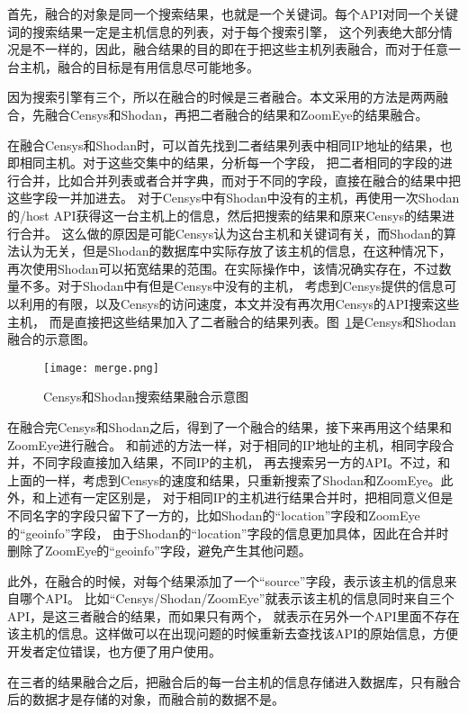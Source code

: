首先，融合的对象是同一个搜索结果，也就是一个关键词。每个API对同一个关键词的搜索结果一定是主机信息的列表，对于每个搜索引擎，
这个列表绝大部分情况是不一样的，因此，融合结果的目的即在于把这些主机列表融合，而对于任意一台主机，融合的目标是有用信息尽可能地多。

因为搜索引擎有三个，所以在融合的时候是三者融合。本文采用的方法是两两融合，先融合Censys和Shodan，再把二者融合的结果和ZoomEye的结果融合。

在融合Censys和Shodan时，可以首先找到二者结果列表中相同IP地址的结果，也即相同主机。对于这些交集中的结果，分析每一个字段，
把二者相同的字段的进行合并，比如合并列表或者合并字典，而对于不同的字段，直接在融合的结果中把这些字段一并加进去。
对于Censys中有Shodan中没有的主机，再使用一次Shodan的/host API获得这一台主机上的信息，然后把搜索的结果和原来Censys的结果进行合并。
这么做的原因是可能Censys认为这台主机和关键词有关，而Shodan的算法认为无关，但是Shodan的数据库中实际存放了该主机的信息，在这种情况下，
再次使用Shodan可以拓宽结果的范围。在实际操作中，该情况确实存在，不过数量不多。对于Shodan中有但是Censys中没有的主机，
考虑到Censys提供的信息可以利用的有限，以及Censys的访问速度，本文并没有再次用Censys的API搜索这些主机，
而是直接把这些结果加入了二者融合的结果列表。图~\ref{fig:merge}是Censys和Shodan融合的示意图。

\begin{figure}[H]
    \centering
    \texttt{[image: merge.png]}
    \caption{Censys和Shodan搜索结果融合示意图}
    \label{fig:merge}
  \end{figure}

在融合完Censys和Shodan之后，得到了一个融合的结果，接下来再用这个结果和ZoomEye进行融合。
和前述的方法一样，对于相同的IP地址的主机，相同字段合并，不同字段直接加入结果，不同IP的主机，
再去搜索另一方的API。不过，和上面的一样，考虑到Censys的速度和结果，只重新搜索了Shodan和ZoomEye。此外，和上述有一定区别是，
对于相同IP的主机进行结果合并时，把相同意义但是不同名字的字段只留下了一方的，比如Shodan的“location”字段和ZoomEye的“geoinfo”字段，
由于Shodan的“location”字段的信息更加具体，因此在合并时删除了ZoomEye的“geoinfo”字段，避免产生其他问题。

此外，在融合的时候，对每个结果添加了一个“source”字段，表示该主机的信息来自哪个API。
比如“Censys/Shodan/ZoomEye”就表示该主机的信息同时来自三个API，是这三者融合的结果，而如果只有两个，
就表示在另外一个API里面不存在该主机的信息。这样做可以在出现问题的时候重新去查找该API的原始信息，方便开发者定位错误，也方便了用户使用。

在三者的结果融合之后，把融合后的每一台主机的信息存储进入数据库，只有融合后的数据才是存储的对象，而融合前的数据不是。

